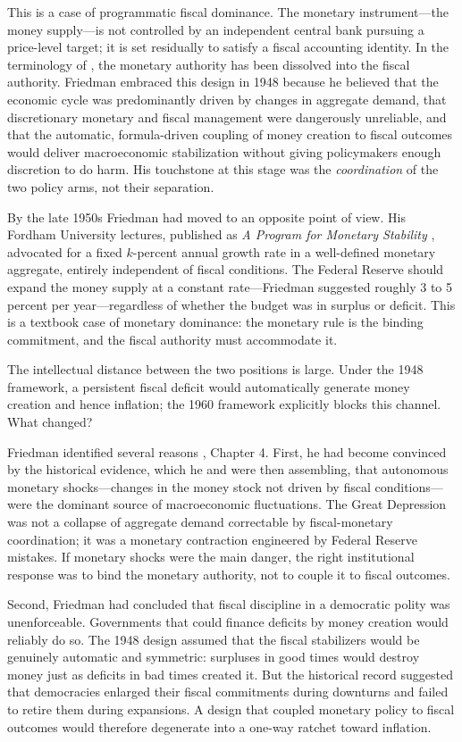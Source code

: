 \documentclass[12pt]{article}
\begin{document}
This is a case of programmatic fiscal dominance.  The monetary
instrument---the money supply---is not controlled by an independent
central bank pursuing a price-level target; it is set residually to
satisfy a fiscal accounting identity.  In the terminology of
\citet{Sargent2011}, the monetary authority has been dissolved into
the fiscal authority.  Friedman embraced this design in 1948 because he
believed that the economic cycle was predominantly driven by changes in
aggregate demand, that discretionary monetary and fiscal management were
dangerously unreliable, and that the automatic, formula-driven coupling
of money creation to fiscal outcomes would deliver macroeconomic
stabilization without giving policymakers enough discretion to do harm.
His touchstone at this stage was the \textit{coordination} of the two
policy arms, not their separation.

By the late 1950s Friedman had moved to an opposite point of view.  His Fordham University
lectures, published as \textit{A Program for Monetary Stability}
\citep{Friedman1960}, advocated for a fixed $k$-percent annual growth
rate in a well-defined monetary aggregate, entirely independent of
fiscal conditions.  The Federal Reserve should expand the money supply
at a constant rate---Friedman suggested roughly 3 to 5 percent per
year---regardless of whether the budget was in surplus or deficit.
This is a textbook case of monetary dominance: the monetary rule is the
binding commitment, and the fiscal authority must accommodate it.

The intellectual distance between the two positions is large.  Under
the 1948 framework, a persistent fiscal deficit would automatically
generate money creation and hence inflation; the 1960 framework
explicitly blocks this channel.  What changed?

Friedman identified several reasons \citep{Friedman1960}, Chapter 4.
First, he had become convinced by the historical evidence, which he and
\citet{FriedmanSchwartz1963} were then assembling, that autonomous
monetary shocks---changes in the money stock not driven by fiscal
conditions---were the dominant source of macroeconomic fluctuations.
The Great Depression was not a collapse of aggregate demand correctable
by fiscal-monetary coordination; it was a monetary
contraction engineered by Federal Reserve mistakes.  If monetary shocks
were the main danger, the right institutional response was to bind the
monetary authority, not to couple it to fiscal outcomes.

Second, Friedman had concluded that fiscal discipline in a democratic
polity was unenforceable.  Governments that could finance
deficits by money creation would reliably do so.  The 1948 design assumed
that the fiscal stabilizers would be genuinely automatic and symmetric:
surpluses in good times would destroy money just as deficits in bad times
created it.  But the historical record suggested that democracies enlarged
their fiscal commitments during downturns and failed to retire them
during expansions.  A design that coupled monetary policy to fiscal
outcomes would therefore degenerate into a one-way ratchet toward
inflation.
\end{document}
